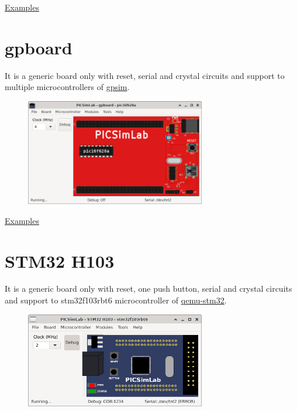 \href{https://lcgamboa.github.io/picsimlab_examples/board_ESP32-DevKitC.html}{Examples}


\section{gpboard}

It is a generic board only with reset, serial and crystal circuits and support to multiple microcontrollers 
of \href{http://gpsim.sourceforge.net/}{gpsim}.

\begin{figure}[H]
\center
\includegraphics[width=0.7\textwidth]{img/gpboard.png} 
\end{figure} 

\href{https://lcgamboa.github.io/picsimlab_examples/board_gpboard.html}{Examples}


\section{STM32 H103}

It is a generic board only with reset, one push button, serial and crystal circuits and support to stm32f103rbt6 microcontroller of 
\href{https://beckus.github.io/qemu_stm32/}{qemu-stm32}.

\begin{figure}[H]
\center
\includegraphics[width=0.7\textwidth]{img/STM32_H103.png} 
\end{figure} 

